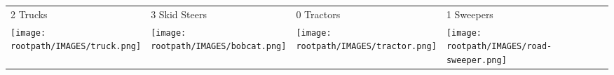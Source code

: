 \begin{tabular}{m{}m{}m{}m{}}
    {\color{ccorange} 2 Trucks} & {\color{ccorange} 3 Skid Steers} & {\color{ccorange} 0 Tractors} & {\color{ccorange} 1 Sweepers} \\
    \texttt{[image: \\rootpath/IMAGES/truck.png]}  & \texttt{[image: \\rootpath/IMAGES/bobcat.png]} & \texttt{[image: \\rootpath/IMAGES/tractor.png]} & \texttt{[image: \\rootpath/IMAGES/road-sweeper.png]}                         
    \end{tabular}